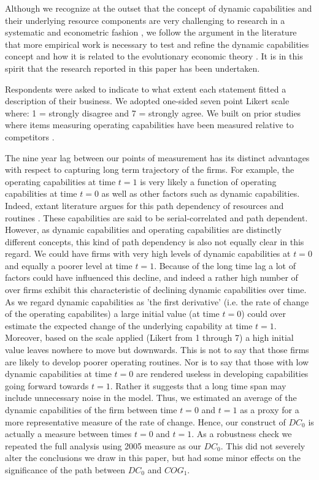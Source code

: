 \documentclass[review,fleqn]{elsarticle}\usepackage[]{graphicx}\usepackage[]{color}
\begin{document}
Although we recognize at the outset that the concept of dynamic capabilities and their
underlying resource components are very challenging to research in a systematic and
econometric fashion \citep{McKelvie2009}, we follow the argument in the literature that
more empirical work is necessary to test and refine the dynamic capabilities concept and
how it is related to the evolutionary economic theory \citep{Arend2009,McKelvie2009}.  It
is in this spirit that the research reported in this paper has been undertaken.

Respondents were asked to indicate to what extent each statement fitted a description of
their business. We adopted one-sided seven point Likert scale where: 1 = strongly disagree
and 7 = strongly agree. We built on prior studies where items measuring operating
capabilities have been measured relative to competitors \citep{McKelvie2009}.

The nine year lag between our points of measurement has its distinct advantages with
respect to capturing long term trajectory of the firms. For example, the operating
capabilities at time $t=1$ is very likely a function of operating capabilities at time
$t=0$ as well as other factors such as dynamic capabilities. Indeed, extant literature
argues for this path dependency of resources and routines
\citep{Helfat2007,Winter2003}. These capabilities are said to be serial-correlated and
path dependent. However, as dynamic capabilities and operating capabilities are distinctly
different concepts, this kind of path dependency is also not equally clear in this
regard. We could have firms with very high levels of dynamic capabilities at $t=0$ and
equally a poorer level at time $t=1$. Because of the long time lag a lot of factors could
have influenced this decline, and indeed a rather high number of over firms exhibit this
characteristic of declining dynamic capabilities over time. As we regard dynamic
capabilities as 'the first derivative' \citep{Winter2003} (i.e. the rate of change of the
operating capabilites) a large initial value (at time $t=0$) could over estimate the
expected change of the underlying capability at time $t=1$. Moreover, based on the scale
applied (Likert from 1 through 7) a high initial value leaves nowhere to move but
downwards. This is not to say that those firms are likely to develop poorer operating
routines. Nor is to say that those with low dynamic capabilities at time $t=0$ are
rendered useless in developing capabilities going forward towards $t=1$. Rather it
suggests that a long time span may include unnecessary noise in the model. Thus, we
estimated an average of the dynamic capabilities of the firm between time $t=0$ and $t=1$
as a proxy for a more representative measure of the rate of change. Hence, our construct
of $DC_0$ is actually a measure between times $t=0$ and $t=1$. As a robustness check we
repeated the full analysis using 2005 measure as our $DC_0$. This did not severely alter
the conclusions we draw in this paper, but had some minor effects on the significance of
the path between $DC_0$ and $COG_1$.
\end{document}
